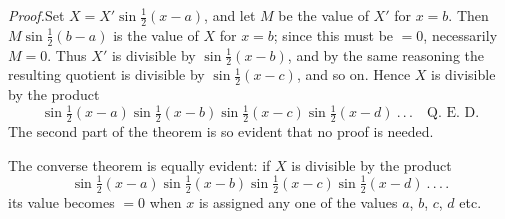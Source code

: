 \textit{Proof.}\quad Set $X=X'\sin\tfrac12(x-a)$, and let $M$ be the value of $X'$ for $x=b$. Then $M\sin\tfrac12(b-a)$ is the value of $X$ for $x=b$; since this must be $=0$, necessarily $M=0$. Thus $X'$ is divisible by $\sin\tfrac12(x-b)$, and by the same reasoning the resulting quotient is divisible by $\sin\tfrac12(x-c)$, and so on. Hence $X$ is divisible by the product
\[
\sin\tfrac12(x-a)\sin\tfrac12(x-b)\sin\tfrac12(x-c)\sin\tfrac12(x-d)\ .\,.\,.\quad\text{Q.~E.~D.}
\]
The second part of the theorem is so evident that no proof is needed.

The converse theorem is equally evident: if $X$ is divisible by the product
\[
\sin\tfrac12(x-a)\sin\tfrac12(x-b)\sin\tfrac12(x-c)\sin\tfrac12(x-d)\ .\,.\,.\,.
\]
its value becomes $=0$ when $x$ is assigned any one of the values $a$, $b$, $c$, $d$ etc.

\endgroup
